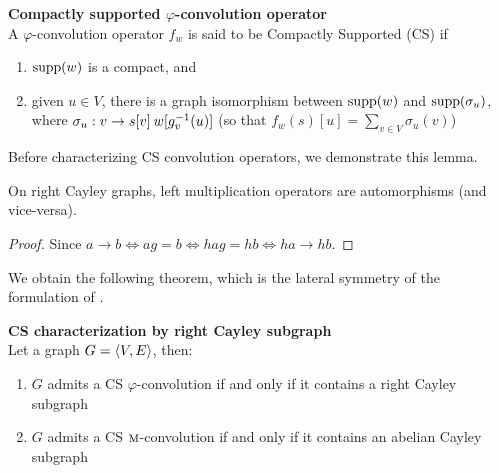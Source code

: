 \begin{definition}\textbf{Compactly supported $\varphi$-convolution operator}\\
A $\varphi$-convolution operator $f_w$ is said to be Compactly Supported (CS) if
\begin{enumerate}
  \item $\supp(w)$ is a compact, and
  \item given $u \in V$, there is a graph isomorphism between $\supp(w)$ and $\supp(\sigma_u)$, where $\sigma_u: v \to s[v] \h{2} w[g_v^{-1}(u)]$ (so that $f_w(s)[u] = \sum_{v \in V} \sigma_u(v)$)
\end{enumerate}
\end{definition}

Before characterizing CS convolution operators, we demonstrate this lemma.

\begin{lemma}
On right Cayley graphs, left multiplication operators are automorphisms (and vice-versa).
\label{lem:lat}
\end{lemma}
\begin{proof}
Since $a \rightarrow b \Leftrightarrow ag = b \Leftrightarrow hag = hb \Leftrightarrow ha \rightarrow hb$.
\end{proof}

We obtain the following theorem, which is the lateral symmetry of the formulation of .

\begin{theorem}\textbf{CS characterization by right Cayley subgraph}\\
Let a graph $\gve$, then:
\begin{enumerate}[label=(\roman*)]
\item $G$ admits a CS $\varphi$-convolution if and only if it contains a right Cayley subgraph
\item $G$ admits a CS $\M$-convolution if and only if it contains an abelian Cayley subgraph
\end{enumerate}
\label{th:cscayleychar}
\end{theorem}


